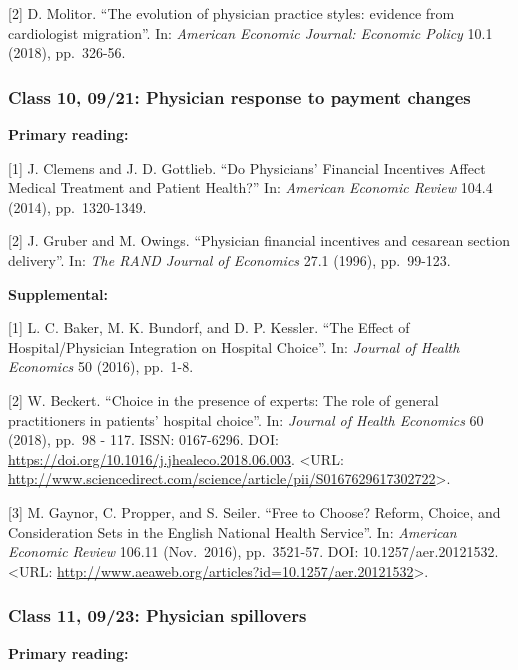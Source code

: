 \documentclass[11pt,]{article}
\begin{document}
{[}2{]} D. Molitor. ``The evolution of physician practice styles:
evidence from cardiologist migration''. In: \emph{American Economic
Journal: Economic Policy} 10.1 (2018), pp.~326-56.

\hypertarget{class-10-0921-physician-response-to-payment-changes}{%
\subsubsection{Class 10, 09/21: Physician response to payment
changes}\label{class-10-0921-physician-response-to-payment-changes}}

\textbf{Primary reading:}

{[}1{]} J. Clemens and J. D. Gottlieb. ``Do Physicians' Financial
Incentives Affect Medical Treatment and Patient Health?'' In:
\emph{American Economic Review} 104.4 (2014), pp.~1320-1349.

{[}2{]} J. Gruber and M. Owings. ``Physician financial incentives and
cesarean section delivery''. In: \emph{The RAND Journal of Economics}
27.1 (1996), pp.~99-123.

\textbf{Supplemental:}

{[}1{]} L. C. Baker, M. K. Bundorf, and D. P. Kessler. ``The Effect of
Hospital/Physician Integration on Hospital Choice''. In: \emph{Journal
of Health Economics} 50 (2016), pp.~1-8.

{[}2{]} W. Beckert. ``Choice in the presence of experts: The role of
general practitioners in patients' hospital choice''. In: \emph{Journal
of Health Economics} 60 (2018), pp.~98 - 117. ISSN: 0167-6296. DOI:
\url{https://doi.org/10.1016/j.jhealeco.2018.06.003}. \textless URL:
\url{http://www.sciencedirect.com/science/article/pii/S0167629617302722}\textgreater.

{[}3{]} M. Gaynor, C. Propper, and S. Seiler. ``Free to Choose? Reform,
Choice, and Consideration Sets in the English National Health Service''.
In: \emph{American Economic Review} 106.11 (Nov.~2016), pp.~3521-57.
DOI: 10.1257/aer.20121532. \textless URL:
\url{http://www.aeaweb.org/articles?id=10.1257/aer.20121532}\textgreater.

\hypertarget{class-11-0923-physician-spillovers}{%
\subsubsection{Class 11, 09/23: Physician
spillovers}\label{class-11-0923-physician-spillovers}}

\textbf{Primary reading:}
\end{document}
